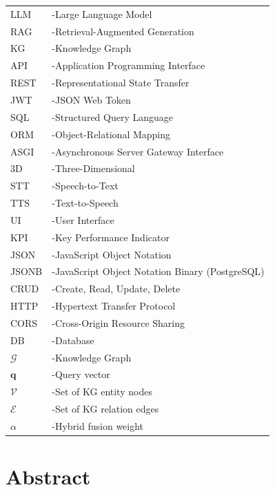 \documentclass[11pt,a4paper]{report}
\begin{document}
\renewcommand{\arraystretch}{1.5}
\begin{tabular*}{\textwidth}{@{\extracolsep{\fill}}l l}
LLM       & -\qquad Large Language Model \\
RAG       & -\qquad Retrieval-Augmented Generation \\
KG        & -\qquad Knowledge Graph \\
API       & -\qquad Application Programming Interface \\
REST      & -\qquad Representational State Transfer \\
JWT       & -\qquad JSON Web Token \\
SQL       & -\qquad Structured Query Language \\
ORM       & -\qquad Object-Relational Mapping \\
ASGI      & -\qquad Asynchronous Server Gateway Interface \\
3D        & -\qquad Three-Dimensional \\
STT       & -\qquad Speech-to-Text \\
TTS       & -\qquad Text-to-Speech \\
UI        & -\qquad User Interface \\
KPI       & -\qquad Key Performance Indicator \\
JSON      & -\qquad JavaScript Object Notation \\
JSONB     & -\qquad JavaScript Object Notation Binary (PostgreSQL) \\
CRUD      & -\qquad Create, Read, Update, Delete \\
HTTP      & -\qquad Hypertext Transfer Protocol \\
CORS      & -\qquad Cross-Origin Resource Sharing \\
DB        & -\qquad Database \\
$\mathcal{G}$ & -\qquad Knowledge Graph \\
$\mathbf{q}$  & -\qquad Query vector \\
$\mathcal{V}$ & -\qquad Set of KG entity nodes \\
$\mathcal{E}$ & -\qquad Set of KG relation edges \\
$\alpha$      & -\qquad Hybrid fusion weight \\
\end{tabular*}
\clearpage

\chapter*{Abstract}
\end{document}
